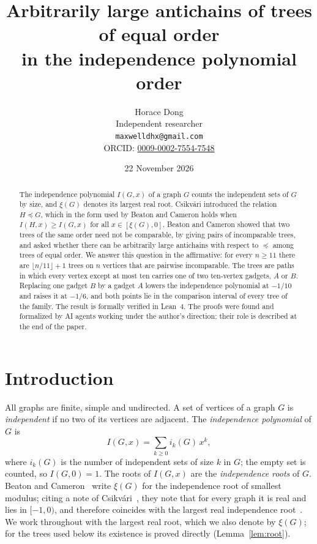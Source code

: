 \documentclass[11pt]{article}
\title{Arbitrarily large antichains of trees of equal order\\ in the independence polynomial order}
\author{Horace Dong\\ \small Independent researcher\\
\small\texttt{maxwelldhx@gmail.com}\\
\small ORCID: \href{https://orcid.org/0009-0002-7554-7548}{0009-0002-7554-7548}}
\date{22 November 2026}
\theoremstyle{definition}
\theoremstyle{remark}
\begin{document}
\maketitle

\begin{abstract}
The independence polynomial $I(G,x)$ of a graph $G$ counts the independent
sets of $G$ by size, and $\xi(G)$ denotes its largest real root. Csikvári
introduced the relation $H\preceq G$, which in the form used by Beaton and
Cameron holds when $I(H,x)\ge I(G,x)$ for
all $x\in[\xi(G),0]$. Beaton and Cameron showed that two trees of the same
order need not be comparable, by giving pairs of incomparable trees, and asked
whether there can be arbitrarily large antichains with respect to $\preceq$
among trees of equal order. We answer this question in the affirmative: for
every $n\ge 11$ there are $\lfloor n/11\rfloor+1$ trees on $n$ vertices that
are pairwise incomparable. The trees are paths in which every vertex except
at most ten carries one of two ten-vertex gadgets, $A$ or $B$. Replacing one
gadget $B$ by a gadget $A$ lowers the independence polynomial at
$-1/10$ and raises it at $-1/6$, and both points lie in the comparison interval
of every tree of the family. The result
is formally verified in Lean~4. The proofs were found and formalized by AI
agents working under the author's direction; their role is described at the
end of the paper.
\end{abstract}

\section{Introduction}

All graphs are finite, simple and undirected. A set of vertices of a graph $G$
is \emph{independent} if no two of its vertices are adjacent. The
\emph{independence polynomial} of $G$ is
\[
I(G,x)=\sum_{k\ge0} i_k(G)\,x^k ,
\]
where $i_k(G)$ is the number of independent sets of size $k$ in $G$; the empty
set is counted, so $I(G,0)=1$. The roots of $I(G,x)$ are the
\emph{independence roots} of $G$. Beaton and Cameron~\cite{bc} write $\xi(G)$
for the independence root of smallest modulus; citing a note of Csikvári~\cite{cs2}, they note that
for every graph it is real and lies in $[-1,0)$, and therefore coincides with
the largest real independence root~\cite[p.~30]{bc}. We work throughout with
the largest real root, which we also denote by $\xi(G)$; for the trees used
below its existence is proved directly (Lemma~\ref{lem:root}).
\end{document}
